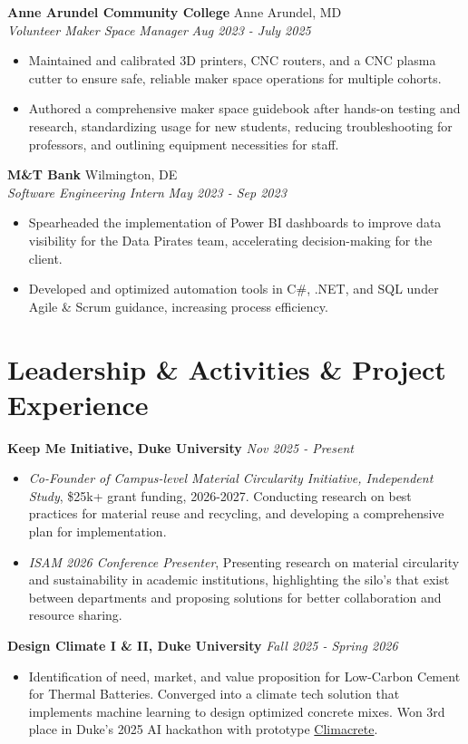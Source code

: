 \documentclass[letterpaper,10pt]{article}
\newcommand{\entry}[4]{%
  \vspace{2pt}
  \noindent\textbf{#1} \hfill #2 \\
  \noindent\textit{#3} \hfill \textit{#4}\par
  \vspace{-2pt}
}
\newcommand{\simpleentry}[2]{%
  \vspace{2pt}
  \noindent\textbf{#1} \hfill \textit{#2}\par
  \vspace{-2pt}
}
\begin{document}
\entry{Anne Arundel Community College}{Anne Arundel, MD}
      {Volunteer Maker Space Manager}{Aug 2023 - July 2025}
      \begin{itemize}
        \item Maintained and calibrated 3D printers, CNC routers, and a CNC plasma cutter to ensure safe, reliable maker space operations for multiple cohorts.
        \item Authored a comprehensive maker space guidebook after hands-on testing and research, standardizing usage for new students, reducing troubleshooting for professors, and outlining equipment necessities for staff.
      \end{itemize}

\entry{M\&T Bank}{Wilmington, DE}
      {Software Engineering Intern}{May 2023 - Sep 2023}
      \begin{itemize}
        \item Spearheaded the implementation of Power BI dashboards to improve data visibility for the Data Pirates team, accelerating decision-making for the client.
        \item Developed and optimized automation tools in C\#, .NET, and SQL under Agile \& Scrum guidance, increasing process efficiency.
      \end{itemize}

\section{Leadership \& Activities \& Project Experience}

\simpleentry{Keep Me Initiative, Duke University}{Nov 2025 - Present}
      \begin{itemize}
        \item \textit{Co-Founder of Campus-level Material Circularity Initiative, Independent Study}, \$25k+ grant funding, 2026-2027. Conducting research on best practices for material reuse and recycling, and developing a comprehensive plan for implementation.
        \item \textit{ISAM 2026 Conference Presenter}, Presenting research on material circularity and sustainability in academic institutions, highlighting the silo's that exist between departments and proposing solutions for better collaboration and resource sharing.
      \end{itemize}

\simpleentry{Design Climate I \& II, Duke University}{Fall 2025 - Spring 2026}
      \begin{itemize}
        \item Identification of need, market, and value proposition for Low-Carbon Cement for Thermal Batteries. Converged into a climate tech solution that implements machine learning to design optimized concrete mixes. Won 3rd place in Duke's 2025 AI hackathon with prototype \href{https://devpost.com/software/climacrete-systems}{Climacrete}.
      \end{itemize}
\end{document}
